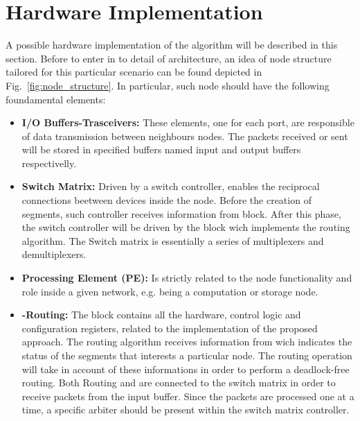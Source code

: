 \section{Hardware Implementation}
\label{sec:implementation}

A possible hardware implementation of the \disr{} algorithm will be
described in this section.  Before to enter in to detail of  \disr{}
architecture,  an idea of node structure tailored for this particular
scenario can be found depicted in Fig.~\ref{fig:node_structure}. In
particular, such node should have the following foundamental elements:

\begin{itemize}%

	\item \textbf{I/O Buffers-Trasceivers:} These elements, one for
	each port,  are responsible of data transmission between neighbours
	nodes. The packets received or sent will be stored in specified buffers
	named input and output buffers respectivelly.

	\item \textbf{Switch Matrix:} Driven by a switch controller, enables the
	reciprocal connections beetween		 devices inside the node. Before
	the creation of segments, such controller receives information from
	\disr{} block.  After this phase, the switch controller will be driven by
	the block wich implements the routing algorithm. The Switch matrix is
	essentially a series of multiplexers and demultiplexers.

	\item  \textbf{Processing Element (PE):} Is strictly related to the node
	functionality  and role inside a given network, e.g. being a
	computation or storage node.

	\item \textbf{\disr{}-Routing:} The \disr{} block contains all the hardware, control
	logic and configuration registers, related to the implementation of the
	proposed approach. The routing algorithm receives information
	from \disr{}  wich indicates the status of the segments that interests a
	particular node. The routing operation will take in account of these
	informations in order to perform a deadlock-free routing. Both Routing
	and \disr{} are connected to the switch matrix in order to receive
	packets from the input buffer. Since the packets are processed one at
	a time, a specific arbiter should be present within the switch matrix
	controller. 

\end{itemize}%

